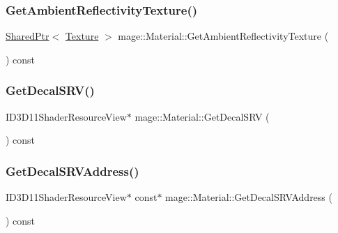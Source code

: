 \hypertarget{structmage_1_1_material_a231f4f13768d54af5a587266f45d734c}{}\label{structmage_1_1_material_a231f4f13768d54af5a587266f45d734c} 
\subsubsection{\texorpdfstring{Get\+Ambient\+Reflectivity\+Texture()}{GetAmbientReflectivityTexture()}}
{\footnotesize\ttfamily \hyperlink{namespacemage_a1e01ae66713838a7a67d30e44c67703e}{Shared\+Ptr}$<$ \hyperlink{classmage_1_1_texture}{Texture} $>$ mage\+::\+Material\+::\+Get\+Ambient\+Reflectivity\+Texture (\begin{DoxyParamCaption}{ }\end{DoxyParamCaption}) const\hspace{0.3cm}{\ttfamily [noexcept]}}

\hypertarget{structmage_1_1_material_a8d189673acfe8d0c104873fe0cceb601}{}\label{structmage_1_1_material_a8d189673acfe8d0c104873fe0cceb601} 
\subsubsection{\texorpdfstring{Get\+Decal\+S\+R\+V()}{GetDecalSRV()}}
{\footnotesize\ttfamily I\+D3\+D11\+Shader\+Resource\+View$\ast$ mage\+::\+Material\+::\+Get\+Decal\+S\+RV (\begin{DoxyParamCaption}{ }\end{DoxyParamCaption}) const\hspace{0.3cm}{\ttfamily [noexcept]}}

\hypertarget{structmage_1_1_material_aaafa9944c4069c983ef2cff9f84e8039}{}\label{structmage_1_1_material_aaafa9944c4069c983ef2cff9f84e8039} 
\subsubsection{\texorpdfstring{Get\+Decal\+S\+R\+V\+Address()}{GetDecalSRVAddress()}}
{\footnotesize\ttfamily I\+D3\+D11\+Shader\+Resource\+View$\ast$ const$\ast$ mage\+::\+Material\+::\+Get\+Decal\+S\+R\+V\+Address (\begin{DoxyParamCaption}{ }\end{DoxyParamCaption}) const\hspace{0.3cm}{\ttfamily [noexcept]}}


